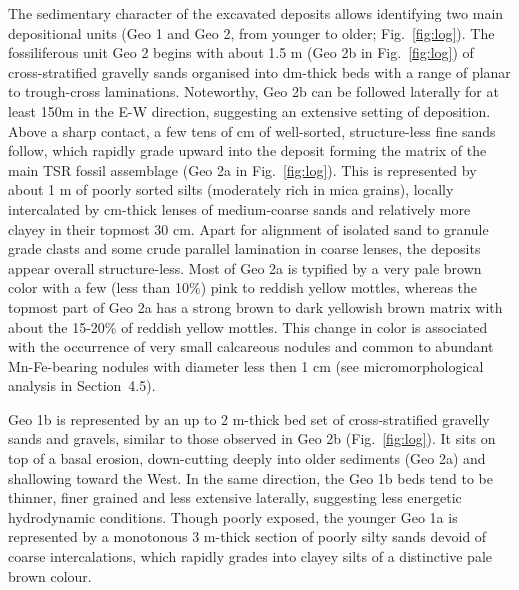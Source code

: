 \documentclass[review,times,authoryear]{elsarticle} %
\begin{document}
The sedimentary character of the excavated deposits allows identifying two main depositional units (Geo 1 and Geo 2, from younger to older; Fig.~\ref{fig:log}). The fossiliferous unit Geo 2 begins with about 1.5 m (Geo 2b in Fig.~\ref{fig:log}) of cross-stratified gravelly sands organised into dm-thick beds with a range of planar to trough-cross laminations. Noteworthy, Geo 2b can be followed laterally for at least 150m in the E-W direction, suggesting an extensive setting of deposition. Above a sharp contact, a few tens of cm of well-sorted, structure-less fine sands follow, which rapidly grade upward into the deposit forming the matrix of the main TSR fossil assemblage (Geo 2a in Fig.~\ref{fig:log}). This is represented by about 1 m of poorly sorted silts (moderately rich in mica grains), locally intercalated by cm-thick lenses of medium-coarse sands and relatively more clayey in their topmost 30 cm. Apart for alignment of isolated sand to granule grade clasts and some crude parallel lamination in coarse lenses, the deposits appear overall structure-less. Most of Geo 2a is typified by a very pale brown color with a few (less than 10\%) pink to reddish yellow mottles, whereas the topmost part of Geo 2a has a strong brown to dark yellowish brown matrix with about the 15-20\% of reddish yellow mottles. This change in color is associated with the occurrence of very small calcareous nodules and common to abundant Mn-Fe-bearing nodules with diameter less then 1 cm (see micromorphological analysis in Section~4.5).

Geo 1b is represented by an up to 2 m-thick bed set of cross-stratified gravelly sands and gravels, similar to those observed in Geo 2b (Fig.~\ref{fig:log}). It sits on top of a basal erosion, down-cutting deeply into older sediments (Geo 2a) and shallowing toward the West. In the same direction, the Geo 1b beds tend to be thinner, finer grained and less extensive laterally, suggesting less energetic hydrodynamic conditions. Though poorly exposed, the younger Geo 1a is represented by a monotonous 3 m-thick section of poorly silty sands devoid of coarse intercalations, which rapidly grades into clayey silts of a distinctive pale brown colour.
\end{document}
